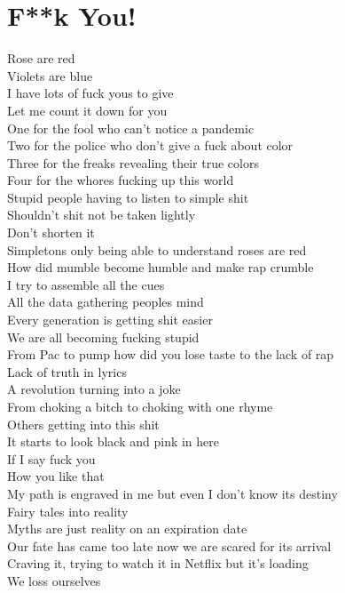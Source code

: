 \documentclass[12pt, b5paper]{article}
\begin{document}
\section{F**k You!}
\par Rose are red
\\Violets are blue
\\I have lots of fuck yous to give
\\Let me count it down for you
\\One for the fool who can't notice a pandemic
\\Two for the police who don't give a fuck about color
\\Three for the freaks revealing their true colors
\\Four for the whores fucking up this world
\\Stupid people having to listen to simple shit
\\Shouldn't shit not be taken lightly
\\Don't shorten it
\\Simpletons only being able to understand roses are red
\\How did mumble become humble and make rap crumble
\\I try to assemble all the cues
\\All the data gathering peoples mind
\\Every generation is getting shit easier
\\We are all becoming fucking stupid
\\From Pac to pump how did you lose taste to the lack of rap
\\Lack of truth in lyrics
\\A revolution turning into a joke
\\From choking a bitch to choking with one rhyme
\\Others getting into this shit
\\It starts to look black and pink in here
\\If I say fuck you
\\How you like that
\\My path is engraved in me but even I don't know its destiny
\\Fairy tales into reality
\\Myths are just reality on an expiration date
\\Our fate has came too late now we are scared for its arrival
\\Craving it, trying to watch it in Netflix but it's loading
\\We loss ourselves
\end{document}
